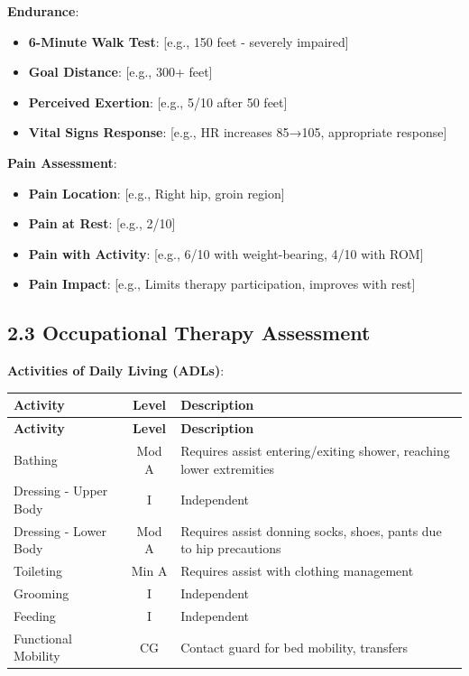 \documentclass[11pt,letterpaper]{article}
\begin{document}
\textbf{Endurance}:
\begin{itemize}[leftmargin=*]
    \item \textbf{6-Minute Walk Test}: [e.g., 150 feet - severely impaired]
    \item \textbf{Goal Distance}: [e.g., 300+ feet]
    \item \textbf{Perceived Exertion}: [e.g., 5/10 after 50 feet]
    \item \textbf{Vital Signs Response}: [e.g., HR increases 85→105, appropriate response]
\end{itemize}

\textbf{Pain Assessment}:
\begin{itemize}[leftmargin=*]
    \item \textbf{Pain Location}: [e.g., Right hip, groin region]
    \item \textbf{Pain at Rest}: [e.g., 2/10]
    \item \textbf{Pain with Activity}: [e.g., 6/10 with weight-bearing, 4/10 with ROM]
    \item \textbf{Pain Impact}: [e.g., Limits therapy participation, improves with rest]
\end{itemize}

\subsection*{2.3 Occupational Therapy Assessment}

\textbf{Activities of Daily Living (ADLs)}:
\begin{longtable}{|l|c|X|}
\hline
\textbf{Activity} & \textbf{Level} & \textbf{Description} \\ \hline
\endfirsthead
\hline
\textbf{Activity} & \textbf{Level} & \textbf{Description} \\ \hline
\endhead
Bathing & Mod A & Requires assist entering/exiting shower, reaching lower extremities \\ \hline
Dressing - Upper Body & I & Independent \\ \hline
Dressing - Lower Body & Mod A & Requires assist donning socks, shoes, pants due to hip precautions \\ \hline
Toileting & Min A & Requires assist with clothing management \\ \hline
Grooming & I & Independent \\ \hline
Feeding & I & Independent \\ \hline
Functional Mobility & CG & Contact guard for bed mobility, transfers \\ \hline
\end{longtable}
\end{document}
